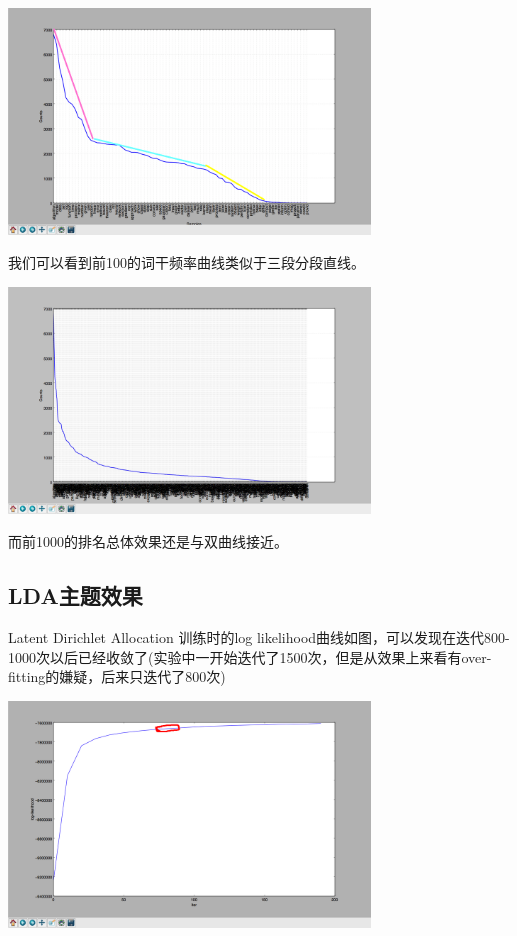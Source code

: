 \documentclass{article}
\begin{document}
\begin{center}
	\includegraphics[height=6cm]{result/v1.0/stem-100}
	
	我们可以看到前100的词干频率曲线类似于三段分段直线。
	
	\includegraphics[height=6cm]{result/v1.0/stem-1000}
	
	而前1000的排名总体效果还是与双曲线接近。
\end{center}

\subsection{LDA主题效果}
Latent Dirichlet Allocation 训练时的log likelihood曲线如图，可以发现在迭代800-1000次以后已经收敛了(实验中一开始迭代了1500次，但是从效果上来看有over-fitting的嫌疑，后来只迭代了800次)
\begin{center}
	\includegraphics[height=6cm]{result/v2.0/lda-iteration}
\end{center}
\end{document}
